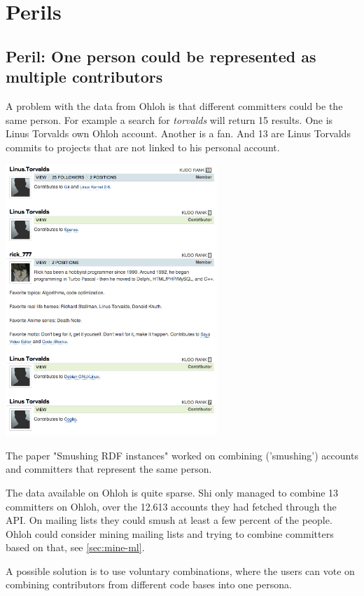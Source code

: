 \documentclass{sig-alternate}
\begin{document}
\section{Perils}

\subsection{Peril: One person could be represented as multiple contributors}\label{need-smushing}

A problem with the data from Ohloh is that different committers could be the same person. For example a search for \emph{torvalds} will return 15 results. One is Linus Torvalds own Ohloh account. Another is a fan. And 13 are Linus Torvalds commits to projects that are not linked to his personal account.

\includegraphics[width=80mm]{TorvaldsSearch.png}

The paper "Smushing RDF instances" \cite{Shi:2008p4464} worked on combining ('smushing') accounts and committers that represent the same person.

The data available on Ohloh is quite sparse. Shi only managed to combine 13 committers on Ohloh, over the 12.613 accounts they had fetched through the API. On mailing lists they could smush at least a few percent of the people. Ohloh could consider mining mailing lists and trying to combine committers based on that, see \ref{sec:mine-ml}.

A possible solution is to use voluntary combinations, where the users can vote on combining contributors from different code bases into one persona. 
\end{document}
